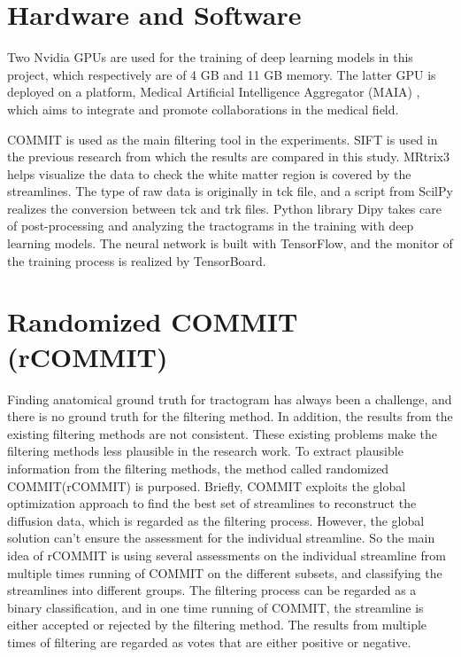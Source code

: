 \section{Hardware and Software}
Two Nvidia GPUs are used for the training of deep learning models in this project, which respectively are of 4 GB and 11 GB memory. 
The latter GPU is deployed on a platform, Medical Artificial Intelligence Aggregator (MAIA) \cite{MAIA}, which aims to integrate and promote collaborations in the medical field.

COMMIT \cite{daducciCOMMITConvexOptimization2015} is used as the main filtering tool in the experiments. 
SIFT \cite{smithSIFTSphericaldeconvolutionInformed2013} is used in the previous research from which the results are compared in this study.
MRtrix3 \cite{tournierMRtrix3FastFlexible2019} helps visualize the data to check the white matter region is covered by the streamlines. 
The type of raw data is originally in tck file, and a script from ScilPy realizes the conversion between tck and trk files.
Python library Dipy takes care of post-processing and analyzing the tractograms in the training with deep learning models.
The neural network is built with TensorFlow, and the monitor of the training process is realized by TensorBoard.

\section{Randomized COMMIT (rCOMMIT)}
Finding anatomical ground truth for tractogram has always been a challenge, and there is no ground truth for the filtering method.
In addition, the results from the existing filtering methods are not consistent. 
These existing problems make the filtering methods less plausible in the research work.
To extract plausible information from the filtering methods, the method called randomized COMMIT(rCOMMIT) is purposed.
Briefly, COMMIT exploits the global optimization approach to find the best set of streamlines to reconstruct the diffusion data,
which is regarded as the filtering process. However, the global solution can't ensure the assessment for the individual streamline.
So the main idea of rCOMMIT is using several assessments on the individual streamline from multiple times running of COMMIT on the different subsets,
and classifying the streamlines into different groups.
The filtering process can be regarded as a binary classification, and in one time running of COMMIT, 
the streamline is either accepted or rejected by the filtering method.
The results from multiple times of filtering are regarded as votes that are either positive or negative.

